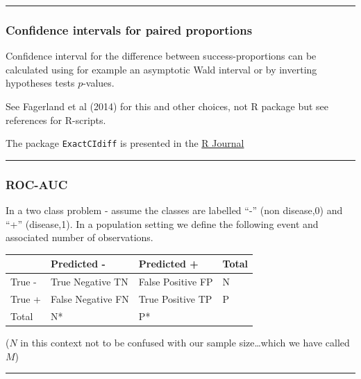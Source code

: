 \documentclass[
  letterpaper,
  DIV=11,
  numbers=noendperiod]{scrartcl}
\begin{document}
\begin{center}\rule{0.5\linewidth}{0.5pt}\end{center}

\hypertarget{confidence-intervals-for-paired-proportions}{%
\subsubsection{Confidence intervals for paired
proportions}\label{confidence-intervals-for-paired-proportions}}

Confidence interval for the difference between success-proportions can
be calculated using for example an asymptotic Wald interval or by
inverting hypotheses tests \(p\)-values.

See Fagerland et al (2014) for this and other choices, not R package but
see references for R-scripts.

The package \texttt{ExactCIdiff} is presented in the
\href{https://rjournal.github.io/archive/2013-2/wang-shan.pdf}{R
Journal}

\begin{center}\rule{0.5\linewidth}{0.5pt}\end{center}

\hypertarget{roc-auc}{%
\subsubsection{ROC-AUC}\label{roc-auc}}

In a two class problem - assume the classes are labelled ``-'' (non
disease,0) and ``+'' (disease,1). In a population setting we define the
following event and associated number of observations.

\begin{longtable}[]{@{}llll@{}}
\toprule()
& Predicted - & Predicted + & Total \\
\midrule()
\endhead
True - & True Negative TN & False Positive FP & N \\
True + & False Negative FN & True Positive TP & P \\
Total & N* & P* & \\
\bottomrule()
\end{longtable}

(\(N\) in this context not to be confused with our sample
size\ldots which we have called \(M\))

\begin{center}\rule{0.5\linewidth}{0.5pt}\end{center}
\end{document}
